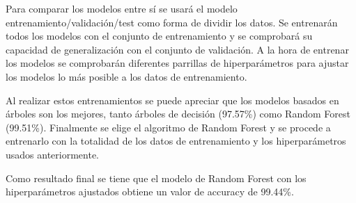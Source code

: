 Para comparar los modelos entre sí se usará el modelo entrenamiento/validación/test como forma de dividir los datos. Se entrenarán todos los modelos con el conjunto de entrenamiento y se comprobará su capacidad de generalización con el conjunto de validación. A la hora de entrenar los modelos se comprobarán diferentes parrillas de hiperparámetros para ajustar los modelos lo más posible a los datos de entrenamiento.

Al realizar estos entrenamientos se puede apreciar que los modelos basados en árboles son los mejores, tanto árboles de decisión (97.57\%) como Random Forest (99.51\%). Finalmente se elige el algoritmo de Random Forest y se procede a entrenarlo con la totalidad de los datos de entrenamiento y los hiperparámetros usados anteriormente. 

Como resultado final se tiene que el modelo de Random Forest con los hiperparámetros ajustados obtiene un valor de accuracy de 99.44\%. 

